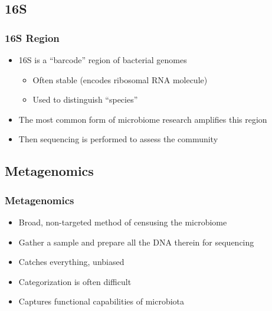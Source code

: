 \documentclass[14pt]{beamer}
\begin{document}
\subsection{16S}

\begin{frame}
\frametitle{16S Region}
\begin{itemize}
	\item<+-> 16S is a ``barcode'' region of bacterial genomes
	\begin{itemize}
		\item<+-> Often stable (encodes ribosomal RNA molecule)
		\item<+-> Used to distinguish ``species''
	\end{itemize}
	\item<+-> The most common form of microbiome research amplifies this region
	\item<+-> Then sequencing is performed to assess the community 
\end{itemize}
\end{frame}

\subsection{Metagenomics}

\begin{frame}
\frametitle{Metagenomics}
\begin{itemize}
	\item<+-> Broad, non-targeted method of censusing the microbiome
	\item<+-> Gather a sample and prepare all the DNA therein for sequencing
	\item<+-> Catches everything, unbiased
	\item<+-> Categorization is often difficult
	\item<+-> Captures functional capabilities of microbiota
\end{itemize}
\end{frame}
\end{document}
